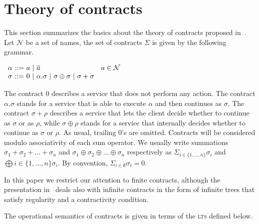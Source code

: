 \documentclass[submission,copyright,creativecommons]{eptcs}
\newcommand{\co}[1]{\overline{#1}}
\begin{document}
 

\section{Theory of contracts}

This section summarizes the basics about the theory of contracts proposed 
in~\cite{CastagnaGP08,CGP09:TCWS}. Let $\mathcal{N}$ be a set of names, the set of contracts $\Sigma$ is 
given by the following grammar.

\begin{math}
   \begin{array}{l@{\ ::=\ }ll}
     \alpha & a \ |\ \co{a} & a\in\mathcal{N}\\
     \sigma & 0 \ |\ \alpha.\sigma \ |\ \sigma\oplus\sigma \ | \ \sigma+\sigma
   \end{array}
\end{math}

The contract 0 describes a service that does not perform any action. The contract
$\alpha.\sigma$ stands for a service that is able to execute $\alpha$ and then 
continues as $\sigma$. The contract $\sigma + \rho$ describes a service that lets
the client decide whether to continue as $\sigma$ or as $\rho$, while $\sigma\oplus\rho$ stands for a service that internally decides whether to continue
as $\sigma$ or $\rho$. As usual, trailing $0$'s are omitted. Contracts will be considered modulo associativity of each sum operator. We 
usually write summations 
$\sigma_1+\sigma_2+\ldots+\sigma_n$ and $\sigma_1\oplus\sigma_2\oplus\ldots\oplus\sigma_n$ respectively as  $\Sigma_{i\in\{1,\ldots,n\}} \sigma_i$ and $\bigoplus {i\in\{1,\ldots,n\}} \sigma_i$. By convention, $\Sigma_{i\in\emptyset} \sigma_i = 0$.

In this paper we restrict our attention to finite contracts, although the presentation in~\cite{CGP09:TCWS} deals also with infinite contracts in the form of infinite trees that satisfy regularity and a contractivity condition.

The operational semantics of contracts is given in terms of the \textsc{lts} defined
below.
\end{document}
